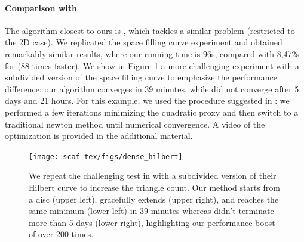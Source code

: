 \paragraph{Comparison with \cite{Smith:2015}}
The algorithm closest to ours is \cite{Smith:2015}, which tackles a similar problem (restricted to the 2D case). We replicated the space filling curve experiment and obtained remarkably similar results, where our running time is 96s, compared with 8,472s for \cite{Smith:2015} (88 times faster). We show in Figure \ref{scaf:fig:smith} a more challenging experiment with a subdivided version of the space filling curve to emphasize the performance difference: our algorithm converges in 39 minutes, while \cite{Smith:2015} did not converge after 5 days and 21 hours. For this example, we used the procedure suggested in \cite{rabinovich2017scalable}: we performed a few iterations minimizing the quadratic proxy and then switch to a traditional newton method until numerical convergence. A video of the optimization is provided in the additional material.

\begin{figure}[t]
\centering
\texttt{[image: scaf-tex/figs/dense\_hilbert]}
\caption{{We repeat the challenging test in \cite{Smith:2015} with a subdivided version of their Hilbert curve to increase the triangle count. Our method starts from a disc (upper left), gracefully extends (upper right), and reaches the same minimum (lower left) in 39 minutes whereas \cite{Smith:2015} didn't terminate more than 5 days (lower right), highlighting our performance boost of over 200 times.
}}
\label{scaf:fig:smith}
\vspace{-0.2cm}
\end{figure}


